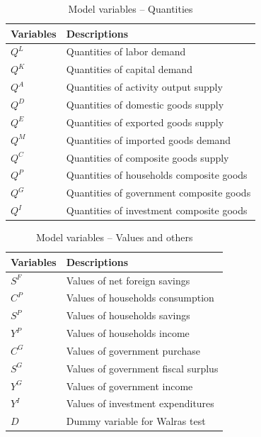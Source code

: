 \documentclass[12pt, a4paper]{article}
\numberwithin{equation}{section}
\numberwithin{figure}{section}
\numberwithin{table}{section}
\begin{document}
\begin{table}[htbp]
	\centering
	\caption{Model variables -- Quantities}
	\label{v2.0-model-variables-quantities}
	\small
	\begin{tabularx}{\linewidth}{@{} l X @{}}
		\toprule
		\textbf{Variables} & \textbf{Descriptions} \\
		\midrule
		$Q^{L}$	& Quantities of labor demand \\
		$Q^{K}$	& Quantities of capital demand \\
		$Q^{A}$	& Quantities of activity output supply \\
		$Q^{D}$	& Quantities of domestic goods supply \\
		$Q^{E}$	& Quantities of exported goods supply \\
		$Q^{M}$	& Quantities of imported goods demand \\
		$Q^C$	& Quantities of composite goods supply \\
		$Q^P$	& Quantities of households composite goods \\
		$Q^G$	& Quantities of government composite goods \\
		$Q^I$	& Quantities of investment composite goods \\
		\bottomrule
	\end{tabularx}
\end{table}

\begin{table}[htbp]
	\centering
	\caption{Model variables -- Values and others}
	\label{v2.0-model-variables-values}
	\small
	\begin{tabularx}{\linewidth}{@{} l X @{}}
		\toprule
		\textbf{Variables} & \textbf{Descriptions} \\
		\midrule
		$S^F$	& Values of net foreign savings \\
		$C^P$	& Values of households consumption \\
		$S^P$	& Values of households savings \\
		$Y^P$	& Values of households income\\
		$C^G$	& Values of government purchase\\
		$S^G$	& Values of government fiscal surplus\\
		$Y^G$	& Values of government income\\
		$Y^I$	& Values of investment expenditures\\
		$D$ 		& Dummy variable for Walras test \\
		\bottomrule
	\end{tabularx}
\end{table}
\end{document}
